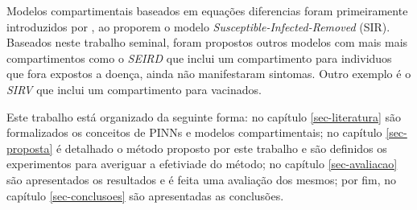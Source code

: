 Modelos compartimentais baseados em equações diferencias foram primeiramente 
introduzidos por \cite{kermack-mcKendrick:1927}, ao proporem o modelo 
\textit{Susceptible-Infected-Removed} (SIR). Baseados neste trabalho seminal,
foram propostos outros modelos com mais mais compartimentos como o 
\textit{SEIRD} \cite{giles:77-sird} que inclui um compartimento para individuos
que fora expostos a doença, ainda não manifestaram sintomas. Outro exemplo é o
\textit{SIRV} \cite{schlickeiser-kroger:21-sirv} que inclui um compartimento
para vacinados.

Este trabalho está organizado da seguinte forma: no capítulo \ref{sec-literatura} 
são formalizados os conceitos de PINNs e modelos compartimentais; 
no capítulo \ref{sec-proposta} é detalhado o método proposto por este 
trabalho e são definidos os experimentos para averiguar a efetiviade
do método; no capítulo \ref{sec-avaliacao} são apresentados os resultados e 
é feita uma avaliação dos mesmos; por fim, no capítulo \ref{sec-conclusoes} são
apresentadas as conclusões.    